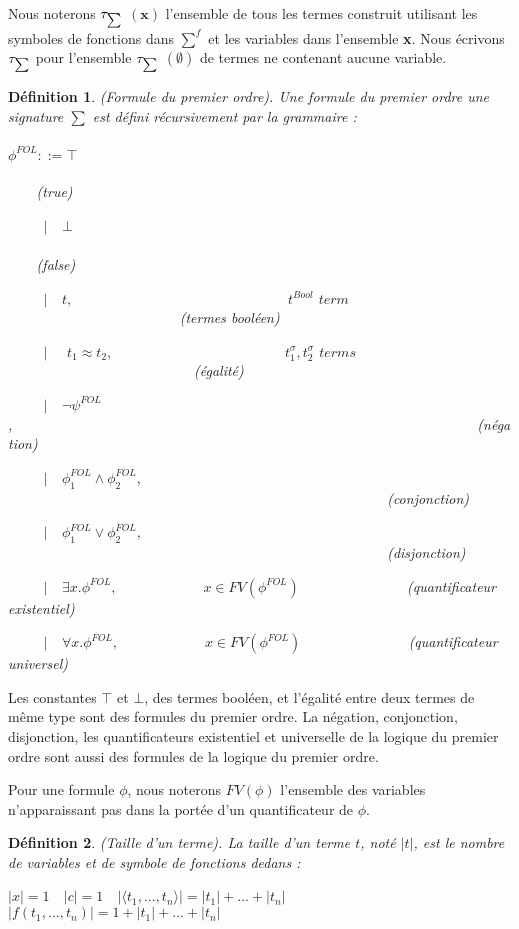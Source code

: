 \documentclass[9pt]{book}
\newtheorem{definition}{D\'efinition}[section]
\begin{document}
Nous noterons $\tau_{\mathsmaller\sum}$ $(\textbf{x})$ l'ensemble de tous les termes construit utilisant les symboles de fonctions dans $\sum^{f}$ et les variables dans l'ensemble \textbf{x}. Nous \'ecrivons $\tau_{\mathsmaller\sum}$ pour l'ensemble $\tau_{\mathsmaller\sum}$ $(\emptyset)$ de termes ne contenant aucune variable.
\begin{definition} 
(Formule du premier ordre). Une formule du premier ordre une signature $\sum$ est d\'efini r\'ecursivement par la grammaire :\\
\\$\phi^{FOL} ::= \top$~~~~~~~~~~~~~~~~~~~~~~~~~~~~~~~~~~~~~~~~~~~~~~~~~~~~~~~~~~~~~~~~~~~~~~~~~~(true)\par
~~~~~$|$~~$\bot$~~~~~~~~~~~~~~~~~~~~~~~~~~~~~~~~~~~~~~~~~~~~~~~~~~~~~~~~~~~~~~~~~~~~~~~~~~(false)
\par
~~~~~$|$~~$t,$~~~~~~~~~~~~~~~~~~~~~~~~~~~~~~$t^{Bool}$ $term$~~~~~~~~~~~~~~~~~~~~~~~~(termes bool\'een)\par
~~~~~$|$~~ $t_{1} \approx t_{2},$~~~~~~~~~~~~~~~~~~~~~~~~$t_{1}^{\sigma},t_{2}^{\sigma}$ $terms$~~~~~~~~~~~~~~~~~~~~~~~~~~(\'egalit\'e)\par
~~~~~$|$~~$\neg\psi^{FOL}$,~~~~~~~~~~~~~~~~~~~~~~~~~~~~~~~~~~~~~~~~~~~~~~~~~~~~~~~~~~~~~~~~~(n\'egation)\par
~~~~~$|$~~$\phi_{1}^{FOL} \land \phi_{2}^{FOL},$~~~~~~~~~~~~~~~~~~~~~~~~~~~~~~~~~~~~~~~~~~~~~~~~~~~~~(conjonction)\par
~~~~~$|$~~$\phi_{1}^{FOL} \lor \phi_{2}^{FOL},$~~~~~~~~~~~~~~~~~~~~~~~~~~~~~~~~~~~~~~~~~~~~~~~~~~~~~(disjonction)\par
~~~~~$|$~~$\exists x.\phi^{FOL},$~~~~~~~~~~~~$x\in FV(\phi^{FOL})$~~~~~~~~~~~~~~~(quantificateur existentiel)\par
~~~~~$|$~~$\forall x.\phi^{FOL},$~~~~~~~~~~~~$x\in FV(\phi^{FOL})$~~~~~~~~~~~~~~~(quantificateur universel)
\end{definition}
Les constantes $\top$ et $\bot$, des termes bool\'een, et l'\'egalit\'e entre deux termes de m\^eme type sont des formules du premier ordre. La n\'egation, conjonction, disjonction, les quantificateurs existentiel et universelle de la logique du premier ordre sont aussi des formules de la logique du premier ordre.\par
	Pour une formule $\phi$, nous noterons $FV(\phi)$ l'ensemble des variables n'apparaissant pas dans la port\'ee d'un quantificateur de $\phi$.
\begin{definition}
(Taille d'un terme). La taille d'un terme $t$, not\'e $|t|$, est le nombre de variables et de symbole de fonctions dedans : \par
$|x| = 1$~~$|c| = 1$~~$|\langle t_{1},...,t_{n}\rangle| = |t_{1}| + ... + |t_{n}|$~~$|f(t_{1},...,t_{n})| = 1 + |t_{1}| + ... + |t_{n}|$
\end{definition}
\end{document}
